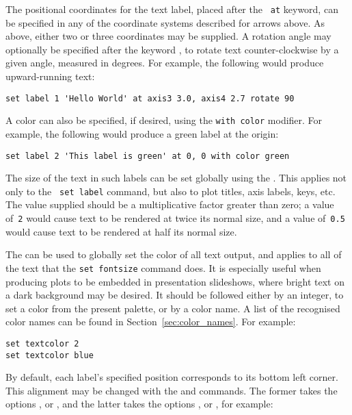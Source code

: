 \noindent The positional coordinates for the text label, placed after the {\tt
at} keyword, can be specified in any of the coordinate systems described for
arrows above. As above, either two or three coordinates may be supplied. A
rotation angle may optionally be specified after the keyword ,
to rotate text counter-clockwise by a given angle, measured in degrees. For
example, the following would produce upward-running text:

\begin{verbatim}
set label 1 'Hello World' at axis3 3.0, axis4 2.7 rotate 90
\end{verbatim}

A color can also be specified, if desired, using the {\tt with color}
modifier.  For example, the following would produce a green label at the origin:

\begin{verbatim}
set label 2 'This label is green' at 0, 0 with color green
\end{verbatim}

 The size of the text in such labels can be set
globally using the . This applies not only to the {\tt
set label} command, but also to plot titles, axis labels, keys, etc. The value
supplied should be a multiplicative factor greater than zero; a
value of~{\tt 2} would cause text to be rendered at twice its normal size, and
a value of~{\tt 0.5} would cause text to be rendered at half its normal size.

 The  can be
used to globally set the color of all text output, and applies to all of the
text that the {\tt set fontsize} command does. It is especially useful when
producing plots to be embedded in presentation slideshows, where bright text on
a dark background may be desired. It should be followed either by an integer,
to set a color from the present palette, or by a color name. A list of the
recognised color names can be found in Section~\ref{sec:color_names}.  For
example:

\begin{verbatim}
set textcolor 2
set textcolor blue
\end{verbatim}

By default, each label's specified
position corresponds to its bottom left corner. This alignment may be changed
with the  and  commands. The
former takes the options ,  or ,
and the latter takes the options ,  or
, for example:

